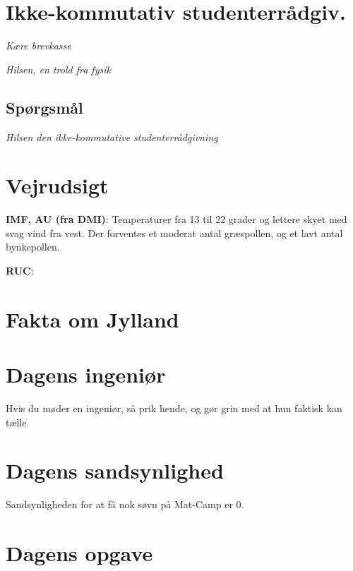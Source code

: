 

\begin{minipage}[b]{0.95\linewidth}
\begin{minipage}[t]{0.47\textwidth}
\vspace{1mm}
\section*{Ikke-kommutativ studenterrådgiv.}
\emph{Kære brevkasse}


\emph{Hilsen, en trold fra fysik}

\subsection*{Spørgsmål}


{\flushright\emph{Hilsen den ikke-kommutative studenterrådgivning}}

\end{minipage}%
\hfill\begin{minipage}[t]{0.47\textwidth}
\vspace{2mm}
\section*{Vejrudsigt}
\textbf{IMF, AU (fra DMI)}: Temperaturer fra 13 til 22 grader og lettere skyet med svag vind fra vest. Der forventes et moderat antal græspollen, og et lavt antal bynkepollen.

\textbf{RUC}: 

\section*{Fakta om Jylland}

\section*{Dagens ingeniør}
Hvis du møder en ingeniør, så prik hende, og gør grin med at hun faktisk kan tælle.

\section*{Dagens sandsynlighed}
Sandsynligheden for at få nok søvn på Mat-Camp er $0$.

\section*{Dagens opgave}


\end{minipage}
\end{minipage}
